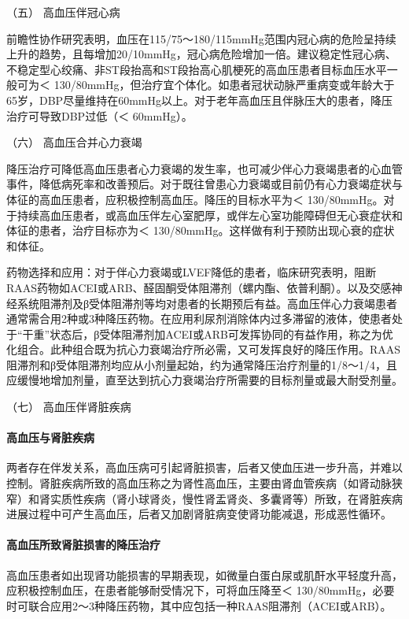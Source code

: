 \hypertarget{text00409.htmlux5cux23CHP17-3-1-8-5}{}
（五） 高血压伴冠心病

前瞻性协作研究表明，血压在115/75～180/115mmHg范围内冠心病的危险呈持续上升的趋势，且每增加20/10mmHg，冠心病危险增加一倍。建议稳定性冠心病、不稳定型心绞痛、非ST段抬高和ST段抬高心肌梗死的高血压患者目标血压水平一般可为＜
130/80mmHg，但治疗宜个体化。如患者冠状动脉严重病变或年龄大于65岁，DBP尽量维持在60mmHg以上。对于老年高血压且伴脉压大的患者，降压治疗可导致DBP过低（＜
60mmHg）。

\hypertarget{text00409.htmlux5cux23CHP17-3-1-8-6}{}
（六） 高血压合并心力衰竭

降压治疗可降低高血压患者心力衰竭的发生率，也可减少伴心力衰竭患者的心血管事件，降低病死率和改善预后。对于既往曾患心力衰竭或目前仍有心力衰竭症状与体征的高血压患者，应积极控制高血压。降压的目标水平为＜
130/80mmHg。对于持续高血压患者，或高血压伴左心室肥厚，或伴左心室功能障碍但无心衰症状和体征的患者，治疗目标亦为＜
130/80mmHg。这样做有利于预防出现心衰的症状和体征。

药物选择和应用：对于伴心力衰竭或LVEF降低的患者，临床研究表明，阻断RAAS药物如ACEI或ARB、醛固酮受体阻滞剂（螺内酯、依普利酮）。以及交感神经系统阻滞剂及β受体阻滞剂等均对患者的长期预后有益。高血压伴心力衰竭患者通常需合用2种或3种降压药物。在应用利尿剂消除体内过多滞留的液体，使患者处于“干重”状态后，β受体阻滞剂加ACEI或ARB可发挥协同的有益作用，称之为优化组合。此种组合既为抗心力衰竭治疗所必需，又可发挥良好的降压作用。RAAS阻滞剂和β受体阻滞剂均应从小剂量起始，约为通常降压治疗剂量的1/8～1/4，且应缓慢地增加剂量，直至达到抗心力衰竭治疗所需要的目标剂量或最大耐受剂量。

\hypertarget{text00409.htmlux5cux23CHP17-3-1-8-7}{}
（七） 高血压伴肾脏疾病

\paragraph{高血压与肾脏疾病}

两者存在伴发关系，高血压病可引起肾脏损害，后者又使血压进一步升高，并难以控制。肾脏疾病所致的高血压称之为肾性高血压，主要由肾血管疾病（如肾动脉狭窄）和肾实质性疾病（肾小球肾炎，慢性肾盂肾炎、多囊肾等）所致，在肾脏疾病进展过程中可产生高血压，后者又加剧肾脏病变使肾功能减退，形成恶性循环。

\paragraph{高血压所致肾脏损害的降压治疗}

高血压患者如出现肾功能损害的早期表现，如微量白蛋白尿或肌酐水平轻度升高，应积极控制血压，在患者能够耐受情况下，可将血压降至＜
130/80mmHg，必要时可联合应用2～3种降压药物，其中应包括一种RAAS阻滞剂（ACEI或ARB）。

